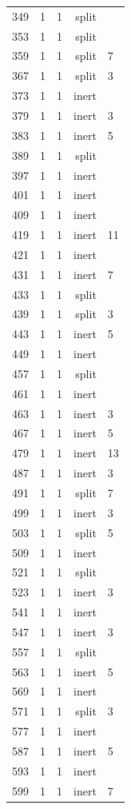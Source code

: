 \begin{longtable}{rrrrl}
349 & 1 & 1 & split &  \\
353 & 1 & 1 & split &  \\
359 & 1 & 1 & split & 7 \\
367 & 1 & 1 & split & 3 \\
373 & 1 & 1 & inert &  \\
379 & 1 & 1 & inert & 3 \\
383 & 1 & 1 & inert & 5 \\
389 & 1 & 1 & split &  \\
397 & 1 & 1 & inert &  \\
401 & 1 & 1 & inert &  \\
409 & 1 & 1 & inert &  \\
419 & 1 & 1 & inert & 11 \\
421 & 1 & 1 & inert &  \\
431 & 1 & 1 & inert & 7 \\
433 & 1 & 1 & split &  \\
439 & 1 & 1 & split & 3 \\
443 & 1 & 1 & inert & 5 \\
449 & 1 & 1 & inert &  \\
457 & 1 & 1 & split &  \\
461 & 1 & 1 & inert &  \\
463 & 1 & 1 & inert & 3 \\
467 & 1 & 1 & inert & 5 \\
479 & 1 & 1 & inert & 13 \\
487 & 1 & 1 & inert & 3 \\
491 & 1 & 1 & split & 7 \\
499 & 1 & 1 & inert & 3 \\
503 & 1 & 1 & split & 5 \\
509 & 1 & 1 & inert &  \\
521 & 1 & 1 & split &  \\
523 & 1 & 1 & inert & 3 \\
541 & 1 & 1 & inert &  \\
547 & 1 & 1 & inert & 3 \\
557 & 1 & 1 & split &  \\
563 & 1 & 1 & inert & 5 \\
569 & 1 & 1 & inert &  \\
571 & 1 & 1 & split & 3 \\
577 & 1 & 1 & inert &  \\
587 & 1 & 1 & inert & 5 \\
593 & 1 & 1 & inert &  \\
599 & 1 & 1 & inert & 7 \\

\end{longtable}
